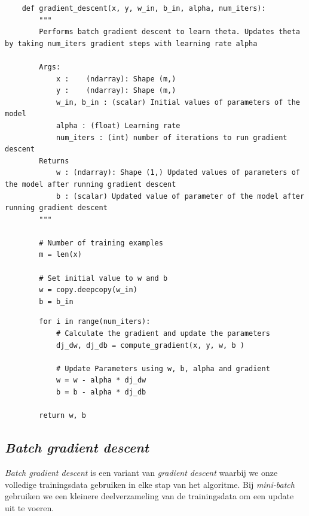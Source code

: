 \begin{lstlisting}
	def gradient_descent(x, y, w_in, b_in, alpha, num_iters): 
	    """
	    Performs batch gradient descent to learn theta. Updates theta by taking num_iters gradient steps with learning rate alpha
	
	    Args:
	        x :    (ndarray): Shape (m,)
	        y :    (ndarray): Shape (m,)
	        w_in, b_in : (scalar) Initial values of parameters of the model
	        alpha : (float) Learning rate
	        num_iters : (int) number of iterations to run gradient descent
	    Returns
	        w : (ndarray): Shape (1,) Updated values of parameters of the model after running gradient descent
	        b : (scalar) Updated value of parameter of the model after running gradient descent
	    """
	
	    # Number of training examples
	    m = len(x)
	
	    # Set initial value to w and b
	    w = copy.deepcopy(w_in)
	    b = b_in
\end{lstlisting}
\newpage
\begin{lstlisting}	
	    for i in range(num_iters):
	        # Calculate the gradient and update the parameters
	        dj_dw, dj_db = compute_gradient(x, y, w, b )  
	
	        # Update Parameters using w, b, alpha and gradient
	        w = w - alpha * dj_dw               
	        b = b - alpha * dj_db               
	
	    return w, b
\end{lstlisting}

\subsection{\textit{Batch gradient descent}}

\textit{Batch gradient descent} is een variant van \textit{gradient descent} waarbij we onze volledige trainingsdata gebruiken in elke stap van het algoritme. Bij \textit{mini-batch} gebruiken we een kleinere deelverzameling van de trainingsdata om een update uit te voeren. 